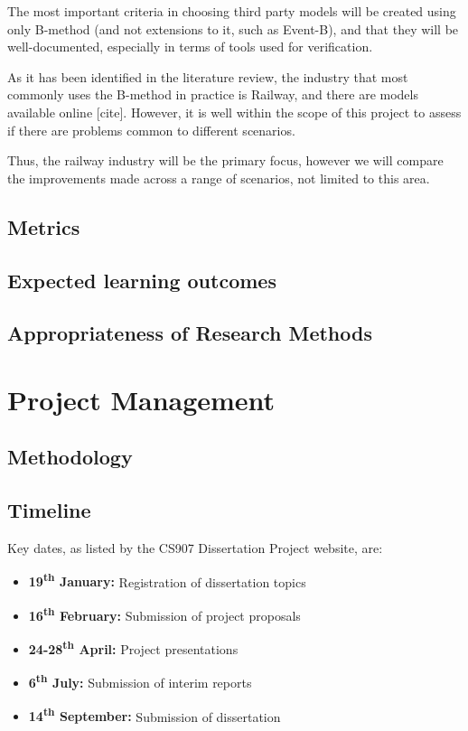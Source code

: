 \documentclass[11pt,journal]{IEEEtran}
\begin{document}
	The most important criteria in choosing third party models will be created using only B-method (and not extensions to it, such as Event-B), and that they will be well-documented, especially in terms of tools used for verification.
	
	As it has been identified in the literature review, the industry that most commonly uses the B-method in practice is Railway, and there are models available online [cite]. However, it is well within the scope of this project to assess if there are problems common to different scenarios.
	
	Thus, the railway industry will be the primary focus, however we will compare the improvements made across a range of scenarios, not limited to this area.
	
	\subsection{Metrics}
	
	\subsection{Expected learning outcomes}
	
	\subsection{Appropriateness of Research Methods}
	
	\section{Project Management}
	
	\subsection{Methodology}
	
	\subsection{Timeline}
	Key dates, as listed by the CS907 Dissertation Project website, are:
	
	\begin{itemize}
		\item \textbf{19\textsuperscript{th} January:} Registration of dissertation topics
		\item \textbf{16\textsuperscript{th} February:} Submission of project proposals
		\item \textbf{24-28\textsuperscript{th} April:} Project presentations
		\item \textbf{6\textsuperscript{th} July:} Submission of interim reports
		\item \textbf{14\textsuperscript{th} September:} Submission of dissertation
	\end{itemize}
\end{document}
